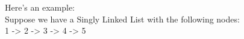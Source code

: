 \documentclass[preview]{standalone}
\begin{document}
Here's an example:\\Suppose we have a Singly Linked List with the following nodes:\\1 -> 2 -> 3 -> 4 -> 5\\
\end{document}

